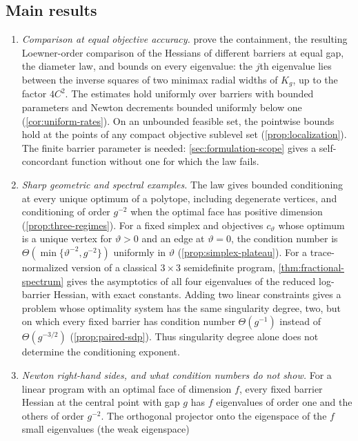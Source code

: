 \subsection{Main results}

\begin{enumerate}
\item \textit{Comparison at equal objective accuracy.}
 prove
the containment, the resulting Loewner-order comparison of the
Hessians of different barriers at equal gap, the diameter law, and
bounds on every eigenvalue: the $j$th eigenvalue lies between the inverse squares
of two minimax radial widths of $K_g$, up to the factor $4C^2$. The estimates
hold uniformly over barriers with bounded parameters and Newton
decrements bounded uniformly below one (\cref{cor:uniform-rates}).
On an unbounded feasible set, the pointwise bounds hold at the points of
any compact objective sublevel set (\cref{prop:localization}).
The finite barrier parameter is needed: \cref{sec:formulation-scope}
gives a self-concordant function without one for which the law fails.
\item \textit{Sharp geometric and spectral examples.}
The law gives bounded conditioning at every unique optimum of a
polytope, including degenerate vertices, and conditioning of order
$g^{-2}$ when the optimal face has positive dimension
(\cref{prop:three-regimes}). For a fixed simplex and objectives
$c_\vartheta$ whose optimum is a unique vertex for $\vartheta>0$ and an
edge at $\vartheta=0$, the condition number is
$\Theta(\min\{\vartheta^{-2},g^{-2}\})$ uniformly in $\vartheta$
(\cref{prop:simplex-plateau}). For a
trace-normalized version of a classical $3\times3$ semidefinite program,
\cref{thm:fractional-spectrum} gives the asymptotics of all four
eigenvalues of the reduced log-barrier Hessian, with exact constants.
Adding two linear constraints gives a problem whose optimality system
has the same singularity degree, two, but on which every fixed barrier
has condition number $\Theta(g^{-1})$ instead of $\Theta(g^{-3/2})$
(\cref{prop:paired-sdp}). Thus singularity degree alone does not
determine the conditioning exponent.
\item \textit{Newton right-hand sides, and what condition numbers do
not show.} For a linear program with an optimal face of dimension $f$,
every fixed barrier Hessian at the central point with gap $g$ has $f$
eigenvalues of order one and the others of order $g^{-2}$. The
orthogonal projector onto the eigenspace of the $f$ small eigenvalues (the weak eigenspace)

\end{enumerate}

